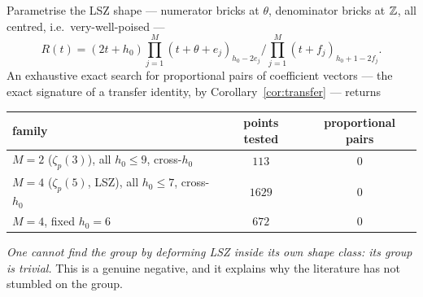 \begin{finding}\label{find:F3}
 Parametrise the
LSZ shape --- numerator bricks at $\theta$, denominator bricks at $\mathbb{Z}$, all centred, i.e.\
very-well-poised ---
\[
 R(t)=(2t+h_0)\prod_{j=1}^{M}(t+\theta+e_j)_{h_0-2e_j}\Big/
      \prod_{j=1}^{M}(t+f_j)_{h_0+1-2f_j}.
\]
An exhaustive exact search for proportional pairs of coefficient vectors --- the exact
signature of a transfer identity, by Corollary~\ref{cor:transfer} --- returns
\begin{center}
\tabsmall
\begin{tabular}{lcc}
\toprule
family & points tested & proportional pairs\\
\midrule
$M=2$ ($\zeta_p(3)$), all $h_0\le9$, cross-$h_0$ & $113$ & $0$\\
$M=4$ ($\zeta_p(5)$, LSZ), all $h_0\le7$, cross-$h_0$ & $1629$ & $0$\\
$M=4$, fixed $h_0=6$ & $672$ & $0$\\
\bottomrule
\end{tabular}
\end{center}
\emph{One cannot find the group by deforming LSZ inside its own shape class: its group is
trivial.} This is a genuine negative, and it explains why the literature has not stumbled on
the group.
\end{finding}

